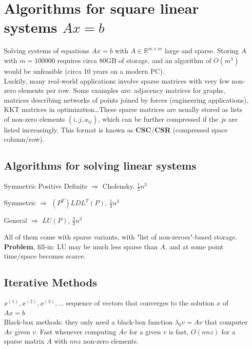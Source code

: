 \documentclass[10pt]{report}
\begin{document}
\section{Algorithms for square linear systems $Ax=b$}
Solving systems of equations $Ax = b$ with $A\in\mathbb{R}^{m\times m}$ large and sparse. Storing $A$ with $m = 100000$ requires circa 80GB of storage, and an algorithm of $O(m^3)$would be unfeasible (circa 10 years on a modern PC).\\
Luckily, many real-world applications involve sparse matrices with very few non-zero elements per row. Some examples are: adjacency matrices for graphs, matrices describing networks of points joined by forces (engineering applications), KKT matrices in optimization\ldots These sparse matrices are usually stored as lists of non-zero elements $(i, j, a_{ij})$, which can be further compressed if the $j$s are listed increasingly. This format is known as \textbf{CSC}/\textbf{CSR} (compressed space column/row).

\subsection{Algorithms for solving linear systems}
\begin{list}{}{}
	\item Symmetric Positive Definite $\Rightarrow$ Cholensky, $\frac{1}{3}n^3$
	\item Symmetric $\Rightarrow$ $(P^T)LDL^T(P)$, $\frac{1}{3}n^3$
	\item General $\Rightarrow$ $LU(P)$, $\frac{2}{3}n^3$
\end{list}
All of them come with sparse variants, with "list of non-zeroes"-based storage.\\
\textbf{Problem}, fill-in: LU may be much less sparse than $A$, and at some point time/space becomes scarce.
\subsection{Iterative Methods} $x^{(1)}, x^{(2)}, x^{(3)},\ldots$ sequence of vectors that converges to the solution $x$ of $Ax = b$\\
Black-box methods: they only need a black-box function $\lambda_0v=Av$ that computer $Av$ given $v$. Fast whenever computing $Av$ for a given $v$ is fast, $O(nnz)$ for a sparse matrix $A$ with $nnz$ non-zero elements.
\end{document}
